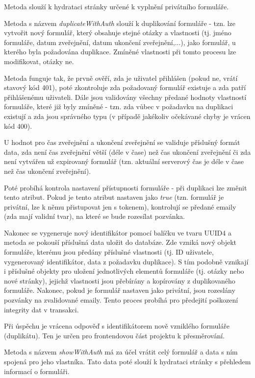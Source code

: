 			Metoda slouží k hydrataci stránky určené k vyplnění privátního formuláře.
			
			Metoda s názvem \textit{duplicateWithAuth} slouží k duplikování formuláře - tzn. lze vytvořit nový formulář, který obsahuje stejné otázky a vlastnosti (tj. jméno formuláře, datum zveřejnění, datum ukončení zveřejnění,...), jako formulář, u kterého byla požadována duplikace. Zmíněné vlastnosti při tomto procesu lze modifikovat, otázky ne.
			
			Metoda funguje tak, že prvně ověří, zda je uživatel přihlášen (pokud ne, vrátí stavový kód 401), poté zkontroluje zda požadovaný formulář existuje a zda patří přihlášenému uživateli. Dále jsou validovány všechny předané hodnoty vlastností formuláře, které již byly zmíněné - tzn. zda vůbec v požadavku na duplikaci existují a zda jsou správného typu (v případě jakékoliv očekávané chyby je vrácen kód 400). 
			
			U hodnot pro čas zveřejnění a ukončení zveřejnění se validuje příslušný formát data, zda není čas zveřejnění větší (déle v čase) než čas ukončení zveřejnění či zda není vytvářen už expirovaný formulář (tzn. aktuální serverový čas je déle v čase než čas ukončení zveřejnění). 
			
			Poté probíhá kontrola nastavení přístupnosti formuláře - při duplikaci lze změnit tento atribut. Pokud je tento atribut nastaven jako \textit{true} (tzn. formulář je privátní, lze k němu přistupovat jen s tokenem), kontrolují se předané emaily (zda mají validní tvar), na které se bude rozesílat pozvánka.
			
			Nakonec se vygeneruje nový identifikátor pomocí balíčku  ve tvaru UUID4 a metoda se pokouší příslušná data uložit do databáze. Zde vzniká nový objekt formuláře, kterému jsou předány příslušné vlastnosti (tj. ID uživatele, vygenerovaný identifikátor, data z požadavku duplikace). S tím podobně vznikají i příslušné objekty pro uložení jednotlivých elementů formuláře (tj. otázky nebo nové stránky), jejichž vlastnosti jsou přebírány a kopírovány z duplikovaného formuláře. Nakonec, pokud je formulář nastaven jako privátní, jsou rozeslány pozvánky na zvalidované emaily. Tento proces probíhá pro předejití poškození integrity dat v transakci.
			
			Při úspěchu je vrácena odpověď s identifikátorem nově vzniklého formuláře (duplikátu). Ten je určen pro frontendovou část projektu k přesměrování.
			
			Metoda s názvem \textit{showWithAuth} má za účel vrátit celý formulář a data s ním spojená pro jeho vlastníka. Tato data poté slouží k hydrataci stránky s přehledem informací o formuláři.
			
